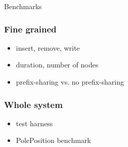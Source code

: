 \documentclass{beamer}
\begin{document}
  \begin{section}{Benchmarks}
    \begin{frame}
      \frametitle{Fine grained}
        \begin{itemize}
          \item insert, remove, write
          \item duration, number of nodes
          \item prefix-sharing vs. no prefix-sharing
        \end{itemize}
    \end{frame}
    \begin{frame}
      \frametitle{Whole system}
        \begin{itemize}
          \item test harness
          \item PolePosition benchmark
        \end{itemize}
    \end{frame}
  \end{section}
\end{document}
